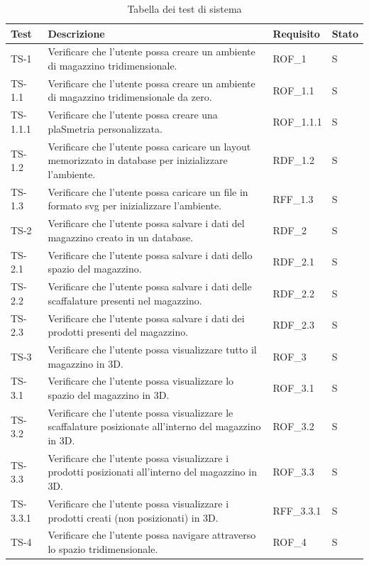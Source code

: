 \begin{xltabular}{0.9\textwidth}{X | p{0.5\textwidth} | X | X}
    \textbf{\color{white} Test} & \textbf{\color{white} Descrizione} & \textbf{\color{white} Requisito} & \textbf{\color{white} Stato}\\ 
    \hline
    \endhead
    \caption{Tabella dei test di sistema} 
    \label{tab:test_sistema}
    \endlastfoot
    TS-1 & Verificare che l'utente possa creare un ambiente di magazzino tridimensionale. & ROF\_1 & S\\
    TS-1.1 & Verificare che l'utente possa creare un ambiente di magazzino tridimensionale da zero. & ROF\_1.1 & S\\
    TS-1.1.1 & Verificare che l'utente possa creare una plaSmetria personalizzata. & ROF\_1.1.1 & S\\
    TS-1.2& Verificare che l'utente possa caricare un layout memorizzato in database per inizializzare l'ambiente. & RDF\_1.2  & S\\
    TS-1.3 & Verificare che l'utente possa caricare un file in formato svg per inizializzare l'ambiente. & RFF\_1.3 & S \\
    TS-2 & Verificare che l'utente possa salvare i dati del magazzino creato in un database. & RDF\_2& S \\
    TS-2.1 & Verificare che l'utente possa salvare i dati dello spazio del magazzino.& RDF\_2.1 & S   \\
    TS-2.2 & Verificare che l'utente possa salvare i dati delle scaffalature presenti nel magazzino. & RDF\_2.2& S   \\
    TS-2.3 & Verificare che l'utente possa salvare i dati dei prodotti presenti del magazzino. & RDF\_2.3& S     \\
    TS-3 & Verificare che l'utente possa visualizzare tutto il magazzino in 3D.& ROF\_3 & S\\
    TS-3.1 & Verificare che l'utente possa visualizzare lo spazio del magazzino in 3D. & ROF\_3.1& S\\
    TS-3.2 & Verificare che l'utente possa visualizzare le scaffalature posizionate all'interno del magazzino in 3D. & ROF\_3.2& S\\
    TS-3.3 & Verificare che l'utente possa visualizzare i prodotti posizionati all'interno del magazzino in 3D. & ROF\_3.3& S\\
    TS-3.3.1 & Verificare che l'utente possa visualizzare i prodotti creati (non posizionati) in 3D. & RFF\_3.3.1& S \\
    TS-4 & Verificare che l'utente possa navigare attraverso lo spazio tridimensionale. & ROF\_4& S\\

\end{xltabular}
